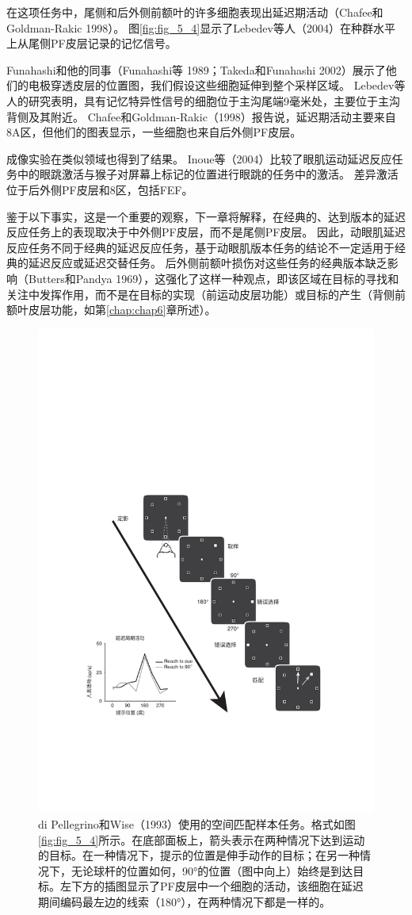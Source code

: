 在这项任务中，尾侧和后外侧前额叶的许多细胞表现出延迟期活动（Chafee和Goldman-Rakic 1998）。
图\ref{fig:fig_5_4}显示了Lebedev等人（2004）在种群水平上从尾侧PF皮层记录的记忆信号。


Funahashi和他的同事（Funahashi等 1989；Takeda和Funahashi 2002）展示了他们的电极穿透皮层的位置图，我们假设这些细胞延伸到整个采样区域。
Lebedev等人的研究表明，具有记忆特异性信号的细胞位于主沟尾端9毫米处，主要位于主沟背侧及其附近。
Chafee和Goldman-Rakic（1998）报告说，延迟期活动主要来自8A区，但他们的图表显示，一些细胞也来自后外侧PF皮层。


成像实验在类似领域也得到了结果。
Inoue等（2004）比较了眼肌运动延迟反应任务中的眼跳激活与猴子对屏幕上标记的位置进行眼跳的任务中的激活。
差异激活位于后外侧PF皮层和8区，包括FEF。


鉴于以下事实，这是一个重要的观察，下一章将解释，在经典的、达到版本的延迟反应任务上的表现取决于中外侧PF皮层，而不是尾侧PF皮层。
因此，动眼肌延迟反应任务不同于经典的延迟反应任务，基于动眼肌版本任务的结论不一定适用于经典的延迟反应或延迟交替任务。
后外侧前额叶损伤对这些任务的经典版本缺乏影响（Butters和Pandya 1969），这强化了这样一种观点，即该区域在目标的寻找和关注中发挥作用，而不是在目标的实现（前运动皮层功能）或目标的产生（背侧前额叶皮层功能，如第\ref{chap:chap6}章所述）。


\begin{figure}
	\centering
	\includegraphics[width=0.7\linewidth]{image_pfc/Fig_5_5}
	\caption{di Pellegrino和Wise（1993）使用的空间匹配样本任务。格式如图\ref{fig:fig_5_4}所示。在底部面板上，箭头表示在两种情况下达到运动的目标。在一种情况下，提示的位置是伸手动作的目标；在另一种情况下，无论球杆的位置如何，90°的位置（图中向上）始终是到达目标。左下方的插图显示了PF皮层中一个细胞的活动，该细胞在延迟期间编码最左边的线索（180°），在两种情况下都是一样的。}
	\label{fig:fig_5_5}
\end{figure}



